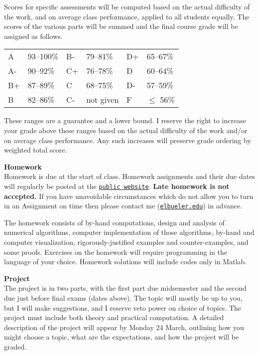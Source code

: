 \documentclass[12pt]{article}
\renewcommand{\emph}[1]{\textsf{\textbf{#1}}}
\newcommand{\localhead}[1]{\par\smallskip\textbf{#1} \smallskip\nobreak\\}%
\def\heading#1{\localhead{\large\emph{#1}}}
\begin{document}
Scores for specific assessments will be computed based on the actual difficulty of the work, and on average class performance, applied to all students equally.  The scores of the various parts will be summed and the final course grade will be assigned as follows.

\begin{tabular}{llllll}
A  & 93--100\% & B- & 79--81\%  & D+ & 65--67\%  \\
A- & 90--92\%  & C+ & 76--78\%  & D  & 60--64\%  \\
B+ & 87--89\%  & C  & 68--75\%  & D- & 57--59\%  \\
B  & 82--86\%  & C- & not given & F  & $\le$ 56\%
\end{tabular}

These ranges are a guarantee and a lower bound.  I reserve the right to increase your grade above these ranges based on the actual difficulty of the work and/or on average class performance.  Any such increases will preserve grade ordering by weighted total score.


\clearpage\newpage
\phantom{x}\vspace{-3mm}

\heading{Homework}
Homework is due at the start of class.  Homework assignments and their due dates will regularly be posted at the \href{https://bueler.github.io/nade/}{\texttt{public website}}.  \emph{Late homework is not accepted.}  If you have unavoidable circumstances which do not allow you to turn in an Assignment on time then please contact me (\href{mailto:elbueler@alaska.edu}{\texttt{elbueler\@@alaska.edu}}) in advance.

The homework consists of by-hand computations, design and analysis of numerical algorithms, computer implementation of those algorithms, by-hand and computer visualization, rigorously-justified examples and counter-examples, and some proofs.  Exercises on the homework will require programming in the language of your choice.  Homework solutions will include codes only in Matlab.


\heading{Project}
The project is in two parts, with the first part due midsemester and the second due just before final exams (dates above).  The topic will mostly be up to you, but I will make suggestions, and I reserve veto power on choice of topics.  The project must include both theory and practical computation.  A detailed description of the project will appear by Monday 24 March, outlining how you might choose a topic, what are the expectations, and how the project will be graded.
\end{document}
